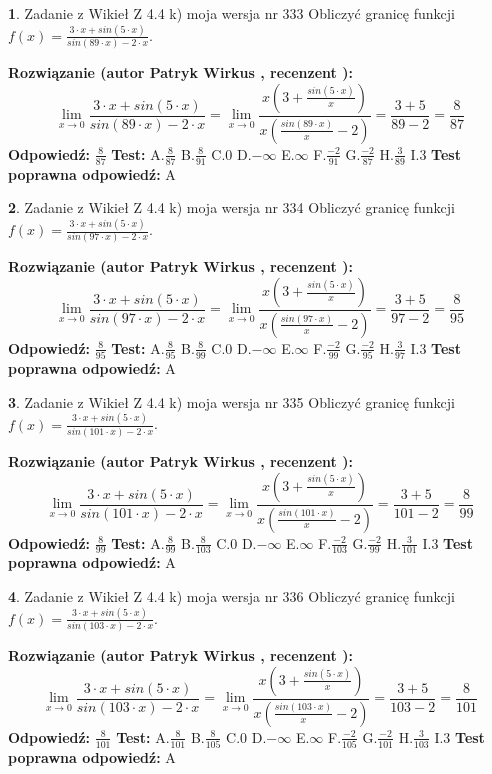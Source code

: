 \documentclass[12pt, a4paper]{article}
\theoremstyle{definition} %
\newtheorem{zad}{}
\newcommand{\zadStart}[1]{\begin{zad}#1\newline}
\newcommand{\zadStop}{\end{zad}}
\newcommand{\rozwStart}[2]{\noindent \textbf{Rozwiązanie (autor #1 , recenzent #2): }\newline}
\newcommand{\rozwStop}{\newline}
\newcommand{\odpStart}{\noindent \textbf{Odpowiedź:}\newline}
\newcommand{\odpStop}{\newline}
\newcommand{\testStart}{\noindent \textbf{Test:}\newline}
\newcommand{\testStop}{\newline}
\newcommand{\kluczStart}{\noindent \textbf{Test poprawna odpowiedź:}\newline}
\newcommand{\kluczStop}{\newline}
\begin{document}
\zadStart{Zadanie z Wikieł Z 4.4 k) moja wersja nr 333}
Obliczyć granicę funkcji $f(x)=\frac{3\cdot x +sin(5\cdot x)}{sin(89\cdot x) -2\cdot x}$.
\zadStop
\rozwStart{Patryk Wirkus}{}
$$\lim\limits_{x\to 0}\frac{3\cdot x +sin(5\cdot x)}{sin(89\cdot x) -2\cdot x}
=\lim\limits_{x\to 0}\frac{x(3+\frac{sin(5\cdot x)}{x})}{x(\frac{sin(89\cdot x)}{x}-2)}
=\frac{3+5}{89-2} = \frac{8}{87}$$
\rozwStop
\odpStart
$\frac{8}{87}$
\odpStop
\testStart
A.$\frac{8}{87}$
B.$\frac{8}{91}$
C.$0$
D.$-\infty$
E.$\infty$
F.$\frac{-2}{91}$
G.$\frac{-2}{87}$
H.$\frac{3}{89}$
I.$3$
\testStop
\kluczStart
A
\kluczStop



\zadStart{Zadanie z Wikieł Z 4.4 k) moja wersja nr 334}
Obliczyć granicę funkcji $f(x)=\frac{3\cdot x +sin(5\cdot x)}{sin(97\cdot x) -2\cdot x}$.
\zadStop
\rozwStart{Patryk Wirkus}{}
$$\lim\limits_{x\to 0}\frac{3\cdot x +sin(5\cdot x)}{sin(97\cdot x) -2\cdot x}
=\lim\limits_{x\to 0}\frac{x(3+\frac{sin(5\cdot x)}{x})}{x(\frac{sin(97\cdot x)}{x}-2)}
=\frac{3+5}{97-2} = \frac{8}{95}$$
\rozwStop
\odpStart
$\frac{8}{95}$
\odpStop
\testStart
A.$\frac{8}{95}$
B.$\frac{8}{99}$
C.$0$
D.$-\infty$
E.$\infty$
F.$\frac{-2}{99}$
G.$\frac{-2}{95}$
H.$\frac{3}{97}$
I.$3$
\testStop
\kluczStart
A
\kluczStop



\zadStart{Zadanie z Wikieł Z 4.4 k) moja wersja nr 335}
Obliczyć granicę funkcji $f(x)=\frac{3\cdot x +sin(5\cdot x)}{sin(101\cdot x) -2\cdot x}$.
\zadStop
\rozwStart{Patryk Wirkus}{}
$$\lim\limits_{x\to 0}\frac{3\cdot x +sin(5\cdot x)}{sin(101\cdot x) -2\cdot x}
=\lim\limits_{x\to 0}\frac{x(3+\frac{sin(5\cdot x)}{x})}{x(\frac{sin(101\cdot x)}{x}-2)}
=\frac{3+5}{101-2} = \frac{8}{99}$$
\rozwStop
\odpStart
$\frac{8}{99}$
\odpStop
\testStart
A.$\frac{8}{99}$
B.$\frac{8}{103}$
C.$0$
D.$-\infty$
E.$\infty$
F.$\frac{-2}{103}$
G.$\frac{-2}{99}$
H.$\frac{3}{101}$
I.$3$
\testStop
\kluczStart
A
\kluczStop



\zadStart{Zadanie z Wikieł Z 4.4 k) moja wersja nr 336}
Obliczyć granicę funkcji $f(x)=\frac{3\cdot x +sin(5\cdot x)}{sin(103\cdot x) -2\cdot x}$.
\zadStop
\rozwStart{Patryk Wirkus}{}
$$\lim\limits_{x\to 0}\frac{3\cdot x +sin(5\cdot x)}{sin(103\cdot x) -2\cdot x}
=\lim\limits_{x\to 0}\frac{x(3+\frac{sin(5\cdot x)}{x})}{x(\frac{sin(103\cdot x)}{x}-2)}
=\frac{3+5}{103-2} = \frac{8}{101}$$
\rozwStop
\odpStart
$\frac{8}{101}$
\odpStop
\testStart
A.$\frac{8}{101}$
B.$\frac{8}{105}$
C.$0$
D.$-\infty$
E.$\infty$
F.$\frac{-2}{105}$
G.$\frac{-2}{101}$
H.$\frac{3}{103}$
I.$3$
\testStop
\kluczStart
A
\kluczStop
\end{document}
